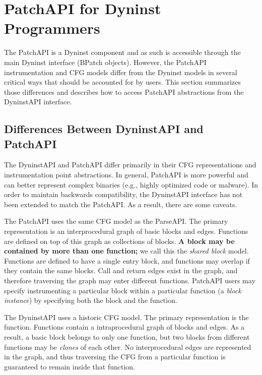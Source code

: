 \appendix
\section{PatchAPI for Dyninst Programmers}
\label{sec:dyninst-programmers}

The PatchAPI is a Dyninst component and as such is accessible through
the main Dyninst interface (BPatch objects). However, the PatchAPI
instrumentation and CFG models differ from the Dyninst models in
several critical ways that should be accounted for by users. This
section summarizes those differences and describes how to access
PatchAPI abstractions from the DyninstAPI interface.

\subsection{Differences Between DyninstAPI and PatchAPI}

The DyninstAPI and PatchAPI differ primarily in their CFG
representations and instrumentation point abstractions. In general,
PatchAPI is more powerful and can better represent complex binaries
(e.g., highly optimized code or malware). In order to maintain
backwards compatibility, the DyninstAPI interface has not been
extended to match the PatchAPI. As a result, there are some caveats.

The PatchAPI uses the same CFG model as the ParseAPI. The primary
representation is an interprocedural graph of basic blocks and
edges. Functions are defined on top of this graph as collections of
blocks. \textbf{A block may be contained by more than one function;}
we call this the \emph{shared block} model. Functions are defined to
have a single entry block, and functions may overlap if they contain
the same blocks. Call and return edges exist in the graph, and
therefore traversing the graph may enter different functions. PatchAPI
users may specify instrumenting a particular block within a particular
function (a \emph{block instance}) by specifying both the block and
the function.

The DyninstAPI uses a historic CFG model. The primary representation
is the function. Functions contain a intraprocedural graph of blocks
and edges. As a result, a basic block belongs to only one function,
but two blocks from different functions may be \emph{clones} of each
other. No interprocedural edges are represented in the graph, and thus
traversing the CFG from a particular function is guaranteed to remain
inside that function.

